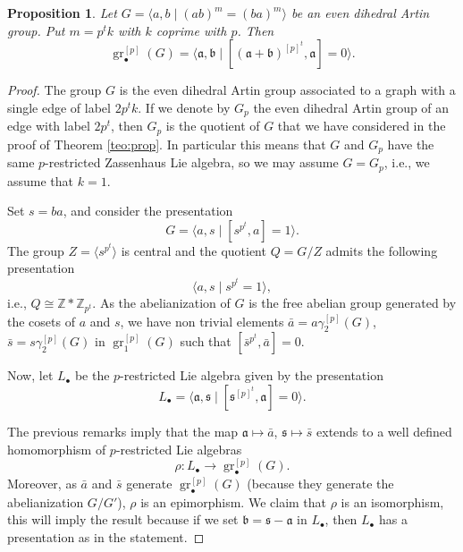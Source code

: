 \documentclass[10pt, oneside]{amsart}
\newcommand{\Z}{\mathbb{Z}} %
\newcommand{\gr}{\operatorname{gr}} %
\newtheorem{proposition}[theorem]{Proposition}
\theoremstyle{definition}
\theoremstyle{remark}
\theoremstyle{plain}
\begin{document}
\begin{proposition}\label{prop:pZdihedral} Let $G=\langle a,b\mid (ab)^m=(ba)^m\rangle$ be an even dihedral Artin group. Put $m=p^tk$ with $k$ coprime with $p$. Then
$$\gr^{[p]}_\bullet(G)=\langle \mathfrak{a},\mathfrak{b}\mid[(\mathfrak{a}+\mathfrak{b})^{[p]^t},\mathfrak{a}]=0\rangle.$$
\end{proposition}
\begin{proof} The group $G$ is the even dihedral Artin group associated to a graph with a single edge of label $2p^tk$.
If we denote by $G_p$ the even dihedral Artin group of an edge with label $2p^t$, then $G_p$ is the quotient of $G$ that we have considered in the proof of Theorem \ref{teo:prop}. In particular this means that $G$ and $G_p$ have the same $p$-restricted Zassenhaus Lie algebra, so we may assume $G=G_p$, i.e., we assume that $k=1$.

Set $s=ba$, and consider the presentation 
$$G=\langle a,s\mid [s^{p^t},a]=1\rangle.$$
The group $Z=\langle s^{p^t}\rangle$ is central and the quotient $Q=G/Z$ admits the following presentation
$$\langle a,s\mid s^{p^t}=1\rangle,$$
i.e., $Q\cong\Z\ast\Z_{p^t}$. As the abelianization of $G$ is the free abelian group generated by the cosets of $a$ and $s$, we have non trivial elements
$\bar{a}=a\gamma_2^{[p]}(G)$, $\bar{s}=s\gamma_2^{[p]}(G)$ in $\gr_1^{[p]}(G)$ such that $[\bar{s}^{p^t},\bar{a}]=0$. 


Now, let $L_\bullet$ be the $p$-restricted Lie algebra given by the presentation
$$L_\bullet=\langle \mathfrak{a},\mathfrak{s}\mid[\mathfrak{s}^{[p]^t},\mathfrak{a}]=0\rangle.$$

The previous remarks imply that the map $\mathfrak{a}\mapsto\bar{a}$, $\mathfrak{s}\mapsto\bar{s}$ extends to  a well defined homomorphism of $p$-restricted Lie algebras
$$\rho:L_\bullet\to\gr^{[p]}_\bullet(G).$$
Moreover, as $\bar{a}$ and $\bar{s}$ generate $\gr^{[p]}_\bullet(G)$ (because they generate the abelianization $G/G'$), $\rho$ is an epimorphism. We claim that $\rho$ is an isomorphism, this will imply the result because if we set $\mathfrak{b}=\mathfrak{s}-\mathfrak{a}$ in $L_\bullet$, then $L_\bullet$ has a presentation as in the statement.


\end{proof}
\end{document}
